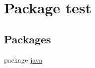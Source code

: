\hypertarget{namespacetest}{}\section{Package test}
\label{namespacetest}
\subsection*{Packages}
\begin{DoxyCompactItemize}
\item 
package \hyperlink{namespacetest_1_1java}{java}
\end{DoxyCompactItemize}
